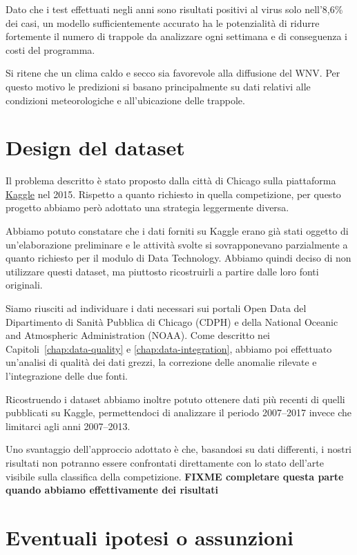 Dato che i test effettuati negli anni sono risultati positivi al virus solo 
nell'8,6\% dei casi, un modello sufficientemente accurato ha le potenzialità di 
ridurre fortemente il numero di trappole da analizzare ogni settimana e di 
conseguenza i costi del programma. 


Si ritene che un clima caldo e secco sia favorevole alla diffusione del WNV. 
Per questo motivo le predizioni si basano principalmente su dati relativi alle 
condizioni meteorologiche e all'ubicazione delle trappole.

\section{Design del dataset}

Il problema descritto è stato proposto dalla città di Chicago sulla piattaforma 
\href{https://www.kaggle.com/c/predict-west-nile-virus}{Kaggle} nel 2015. 
Rispetto a quanto richiesto in quella competizione, per questo progetto abbiamo 
però adottato una strategia leggermente diversa.

Abbiamo potuto constatare che i dati forniti su Kaggle erano già stati oggetto 
di un'elaborazione preliminare e le attività svolte si sovrapponevano 
parzialmente a quanto richiesto per il modulo di Data Technology. Abbiamo 
quindi deciso di non utilizzare questi dataset, ma piuttosto ricostruirli a 
partire dalle loro fonti originali.

Siamo riusciti ad individuare i dati necessari sui portali Open Data del 
Dipartimento di Sanità Pubblica di Chicago (CDPH) e della National Oceanic and 
Atmospheric Administration (NOAA). Come descritto nei 
Capitoli~\ref{chap:data-quality} e \ref{chap:data-integration}, abbiamo poi 
effettuato un'analisi di qualità dei dati grezzi, la correzione delle anomalie 
rilevate e l'integrazione delle due fonti.

Ricostruendo i dataset abbiamo inoltre potuto ottenere dati più recenti di 
quelli pubblicati su Kaggle, permettendoci di analizzare il periodo 2007--2017 
invece che limitarci agli anni 2007--2013.

Uno svantaggio dell'approccio adottato è che, basandosi su dati differenti, i 
nostri risultati non potranno essere confrontati direttamente con lo stato 
dell'arte visibile sulla classifica della competizione. \textbf{FIXME 
completare questa parte quando abbiamo effettivamente dei risultati}

\section{Eventuali ipotesi o assunzioni}

